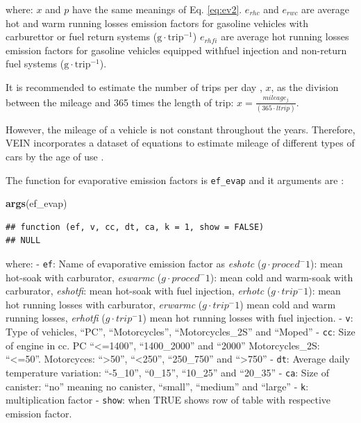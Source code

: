 \documentclass[12pt,graybox,envcountchap,sectrefs]{krantz}
\makeatletter
\newenvironment{Shaded}{\begin{snugshade}}{\end{snugshade}}
\newcommand{\KeywordTok}[1]{\textcolor[rgb]{0.13,0.29,0.53}{\textbf{#1}}}
\newcommand{\NormalTok}[1]{#1}
\newenvironment{kframe}{%
\medskip{}
\setlength{\fboxsep}{.8em}
 \def\at@end@of@kframe{}%
 \ifinner\ifhmode%
  \def\at@end@of@kframe{\end{minipage}}%
  \begin{minipage}{\columnwidth}%
 \fi\fi%
 \def\FrameCommand##1{\hskip\@totalleftmargin \hskip-\fboxsep
 \colorbox{shadecolor}{##1}\hskip-\fboxsep
     \hskip-\linewidth \hskip-\@totalleftmargin \hskip\columnwidth}%
 \MakeFramed {\advance\hsize-\width
   \@totalleftmargin\z@ \linewidth\hsize
   \@setminipage}}%
 {\par\unskip\endMakeFramed%
 \at@end@of@kframe}
\renewenvironment{Shaded}{\begin{kframe}}{\end{kframe}}
\theoremstyle{definition}
\theoremstyle{definition}
\theoremstyle{definition}
\theoremstyle{remark}
\makeatother
\begin{document}
where: \(x\) and \(p\) have the same meanings of Eq. \eqref{eq:ev2}.
\(e_{rhc}\) and \(e_{rwc}\) are average hot and warm running losses
emission factors for gasoline vehicles with carburettor or fuel return
systems (\(\mathrm{g \cdot trip^{-1}}\)) \(e_{rhfi}\) are average hot
running losses emission factors for gasoline vehicles equipped withfuel
injection and non-return fuel systems (\(\mathrm{g \cdot trip^{-1}}\)).

It is recommended to estimate the number of trips per day
\citep{MelliosNtziachristos2016}, \(x\), as the division between the
mileage and 365 times the length of trip:
\(x = \frac{mileage_j}{(365 \cdot ltrip)}\).

However, the mileage of a vehicle is not constant throughout the years.
Therefore, VEIN incorporates a dataset of equations to estimate mileage
of different types of cars by the age of use \citep{BruniBales2013}.

The function for evaporative emission factors is \texttt{ef\_evap} and
it arguments are :

\begin{Shaded}
\begin{Highlighting}[]
\KeywordTok{args}\NormalTok{(ef_evap)}
\end{Highlighting}
\end{Shaded}

\begin{verbatim}
## function (ef, v, cc, dt, ca, k = 1, show = FALSE) 
## NULL
\end{verbatim}

where: - \texttt{ef}: Name of evaporative emission factor as
\emph{eshotc} (\(g \cdot proced^-1\)): mean hot-soak with carburator,
\emph{eswarmc} (\(g \cdot proced^-1\)): mean cold and warm-soak with
carburator, \emph{eshotfi}: mean hot-soak with fuel injection,
\emph{erhotc} (\(g \cdot trip^-1\)): mean hot running losses with
carburator, \emph{erwarmc} (\(g \cdot trip^-1\)) mean cold and warm
running losses, \emph{erhotfi} (\(g \cdot trip^-1\)) mean hot running
losses with fuel injection. - \texttt{v}: Type of vehicles, ``PC'',
``Motorcycles'', ``Motorcycles\_2S'' and ``Moped'' - \texttt{cc}: Size
of engine in cc. PC ``\textless{}=1400'', ``1400\_2000'' and ``2000''
Motorcycles\_2S: ``\textless{}=50''. Motorcyces: ``\textgreater{}50'',
``\textless{}250'', ``250\_750'' and ``\textgreater{}750'' -
\texttt{dt}: Average daily temperature variation: ``-5\_10'', ``0\_15'',
``10\_25'' and ``20\_35'' - \texttt{ca}: Size of canister: ``no''
meaning no canister, ``small'', ``medium'' and ``large'' - \texttt{k}:
multiplication factor - \texttt{show}: when TRUE shows row of table with
respective emission factor.
\end{document}
